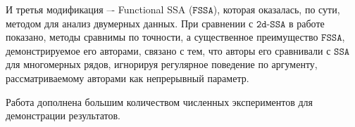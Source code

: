 \documentclass[12pt, specialist, subf
]{disser}
\theoremstyle{definition}
\newcommand{\SSA}{\texttt{SSA}}
\newcommand{\GSSA}{\texttt{GSSA}}
\newcommand{\CISSA}{\texttt{CiSSA}}
\newcommand{\MSSA}{\texttt{MSSA}}
\newcommand{\FSSA}{\texttt{FSSA}}
\newcommand{\DSSA}{\texttt{2d-SSA}}
\begin{document}
И третья модификация –- Functional SSA ($\FSSA$), которая оказалась, по сути, методом для анализ двумерных данных. При сравнении с $\DSSA$ в работе показано, методы сравнимы по точности, а существенное преимущество $\FSSA$, демонстрируемое его авторами, связано с тем, что авторы его сравнивали с $\SSA$ для многомерных рядов, игнорируя регулярное поведение по аргументу, рассматриваемому авторами как непрерывный параметр. 

Работа дополнена большим количеством численных экспериментов для демонстрации результатов.











\newpage



\end{document}
